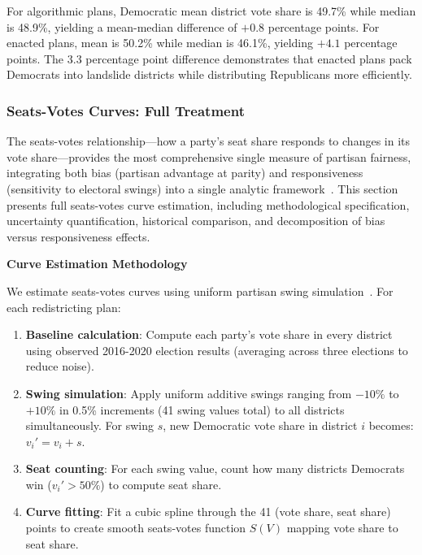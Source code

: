 For algorithmic plans, Democratic mean district vote share is 49.7\% while median is 48.9\%, yielding a mean-median difference of $+0.8$ percentage points. For enacted plans, mean is 50.2\% while median is 46.1\%, yielding $+4.1$ percentage points. The 3.3 percentage point difference demonstrates that enacted plans pack Democrats into landslide districts while distributing Republicans more efficiently.

\subsubsection{Seats-Votes Curves: Full Treatment}
\label{sec:seats-votes-full}

The seats-votes relationship---how a party's seat share responds to changes in its vote share---provides the most comprehensive single measure of partisan fairness, integrating both bias (partisan advantage at parity) and responsiveness (sensitivity to electoral swings) into a single analytic framework~\cite{mcdonald2006comparative,gelman1990bias}. This section presents full seats-votes curve estimation, including methodological specification, uncertainty quantification, historical comparison, and decomposition of bias versus responsiveness effects.

\textbf{Curve Estimation Methodology}

We estimate seats-votes curves using uniform partisan swing simulation~\cite{king1989representation}. For each redistricting plan:

\begin{enumerate}
    \item \textbf{Baseline calculation}: Compute each party's vote share in every district using observed 2016-2020 election results (averaging across three elections to reduce noise).
    \item \textbf{Swing simulation}: Apply uniform additive swings ranging from $-10\%$ to $+10\%$ in 0.5\% increments (41 swing values total) to all districts simultaneously. For swing $s$, new Democratic vote share in district $i$ becomes: $v_i' = v_i + s$.
    \item \textbf{Seat counting}: For each swing value, count how many districts Democrats win ($v_i' > 50\%$) to compute seat share.
    \item \textbf{Curve fitting}: Fit a cubic spline through the 41 (vote share, seat share) points to create smooth seats-votes function $S(V)$ mapping vote share to seat share.
\end{enumerate}

